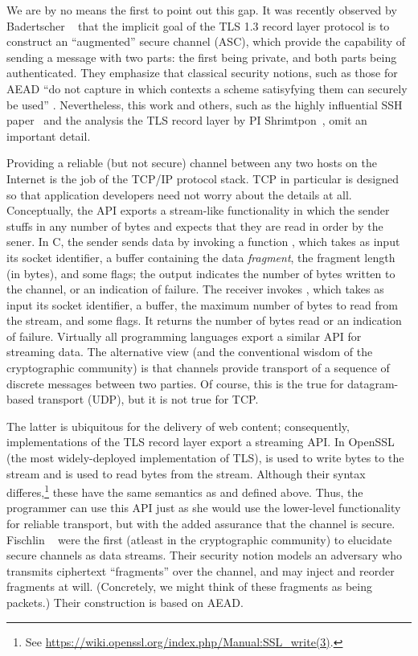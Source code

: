 We are by no means the first to point out this gap. It was recently observed by
Badertscher \etal~\cite{BMM+15} that the implicit goal of the TLS 1.3 record
layer protocol is to construct an ``augmented'' secure channel (ASC), which
provide the capability of sending a message with two parts: the first being
private, and both parts being authenticated. They emphasize that classical
security notions, such as those for AEAD ``do not capture in which contexts a
scheme satisyfying them can securely be used'' \cite[pp. 2]{BMM+15}.
Nevertheless, this work and others, such as the highly influential SSH
paper~\cite{BKN02} and the analysis the TLS record layer by PI
Shrimtpon~\cite{PRS11}, omit an important detail.

Providing a reliable (but not secure) channel between any two hosts on the Internet
is the job of the TCP/IP protocol stack. TCP in particular is designed so that
application developers need not worry about the details at all.
%
Conceptually, the API exports a stream-like functionality in which the sender
stuffs in any number of bytes and expects that they are read in order by the
sener.
%
In C, the sender sends data by invoking a function , which
takes as input its socket identifier, a buffer containing the data
\emph{fragment}, the fragment length (in bytes), and some flags; the output
indicates the number of bytes written to the channel, or an indication of
failure. The receiver invokes , which takes as input its socket
identifier, a buffer, the maximum number of bytes to read from the stream, and
some flags. It returns the number of bytes read or an indication of failure.
%
Virtually all programming languages export a similar API for streaming data. The
alternative view (and the conventional wisdom of the cryptographic community) is
that channels provide transport of a sequence of discrete messages between two
parties. Of course, this is the true for datagram-based transport (UDP), but it
is not true for TCP.

The latter is ubiquitous for the delivery of web content; consequently,
implementations of the TLS record layer export a streaming API. In OpenSSL (the
most widely-deployed implementation of TLS),  is used to
write bytes to the stream and  is used to read bytes from
the stream. Although their syntax differes,\footnote{ See
\url{https://wiki.openssl.org/index.php/Manual:SSL_write(3)}.} these have the
same semantics as  and  defined above. Thus,
the programmer can use this API just as she would use the lower-level
functionality for reliable transport, but with the added assurance that the
channel is secure.
%
Fischlin \etal~\cite{FPMG15} were the first (atleast in the cryptographic
community) to elucidate secure channels as data streams.
%
Their security notion models an adversary who transmits ciphertext ``fragments''
over the channel, and may inject and reorder fragments at will. (Concretely, we
might think of these fragments as being packets.) Their construction is based on
AEAD.

